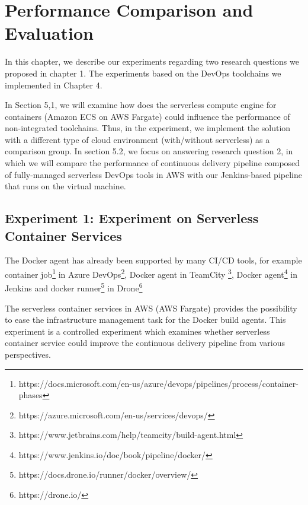 \chapter{Performance Comparison and Evaluation}
In this chapter, we describe our experiments regarding two research questions we proposed in chapter 1. The experiments based on the DevOps toolchains we implemented in Chapter 4.
\par
In Section 5,1, we will examine how does the serverless compute engine for containers (Amazon ECS on AWS Fargate) could influence the performance of non-integrated toolchains. Thus, in the experiment, we implement the solution with a different type of cloud environment (with/without serverless) as a comparison group.
In section 5.2, we focus on answering research question 2, in which we will compare the performance of continuous delivery pipeline composed of fully-managed serverless DevOps tools in AWS with our Jenkins-based pipeline that runs on the virtual machine.
\section{Experiment 1: Experiment on Serverless Container Services}
The Docker agent has already been supported by many CI/CD tools, for example container job\footnote{https://docs.microsoft.com/en-us/azure/devops/pipelines/process/container-phases} in Azure DevOps\footnote{https://azure.microsoft.com/en-us/services/devops/}, Docker agent in TeamCity \footnote{https://www.jetbrains.com/help/teamcity/build-agent.html}, Docker agent\footnote{https://www.jenkins.io/doc/book/pipeline/docker/} in Jenkins and docker runner\footnote{https://docs.drone.io/runner/docker/overview/} in Drone\footnote{https://drone.io/}
\par
The serverless container services in AWS (AWS Fargate) provides the possibility to ease the infrastructure management task for the Docker build agents.
This experiment is a controlled experiment which examines whether serverless container service could improve the continuous delivery pipeline from various perspectives.
